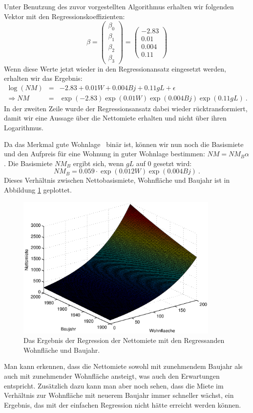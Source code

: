 Unter Benutzung des zuvor vorgestellten Algorithmus erhalten wir folgenden Vektor mit den Regressionskoeffizienten:
\begin{equation*}
  \beta = \begin{pmatrix} \beta_0 \\ \beta_1 \\ \beta_2 \\ \beta_3 \end{pmatrix} = \begin{pmatrix} -2.83 \\ 0.01 \\ 0.004 \\ 0.11 \end{pmatrix}
\end{equation*}
Wenn diese Werte jetzt wieder in den Regressionansatz eingesetzt werden, erhalten wir das Ergebnis:
\begin{eqnarray*}
  \log(NM) & = & -2.83 + 0.01 W + 0.004 Bj + 0.11 gL + \epsilon\\
  \Rightarrow NM & = & \exp(-2.83) \exp(0.01 W) \exp(0.004 Bj) \exp(0.11 gL) ~.
\end{eqnarray*}
In der zweiten Zeile wurde der Regressionsansatz dabei wieder rücktransformiert, damit wir eine Aussage über die Nettomiete erhalten und nicht über ihren Logarithmus.

Da das Merkmal \glqq gute Wohnlage\grqq~ binär ist, können wir nun noch die Basismiete und den Aufpreis für eine Wohnung in guter Wohnlage bestimmen: $NM = NM_B \alpha$.
Die Basismiete $NM_B$ ergibt sich, wenn $gL$ auf 0 gesetzt wird:
\begin{equation*}
  NM_B = 0.059 \cdot \exp(0.012 W) \exp(0.004 Bj) ~.
\end{equation*}
Dieses Verhältnis zwischen Nettobasismiete, Wohnfläche und Baujahr ist in Abbildung \ref{fig:3d_result} geplottet.
\begin{figure}[t]
  \centering
  \includegraphics[width=10cm]{figures/nm_wfl_bj_log_approach}
  \caption{Das Ergebnis der Regression der Nettomiete mit den Regressanden Wohnfläche und Baujahr.}
  \label{fig:3d_result}
\end{figure}
Man kann erkennen, dass die Nettomiete sowohl mit zunehmendem Baujahr als auch mit zunehmender Wohnfläche ansteigt, was auch den Erwartungen entspricht.
Zusätzlich dazu kann man aber noch sehen, dass die Miete im Verhältnis zur Wohnfläche mit neuerem Baujahr immer schneller wächst, ein Ergebnis, das mit der einfachen Regression nicht hätte erreicht werden können.

